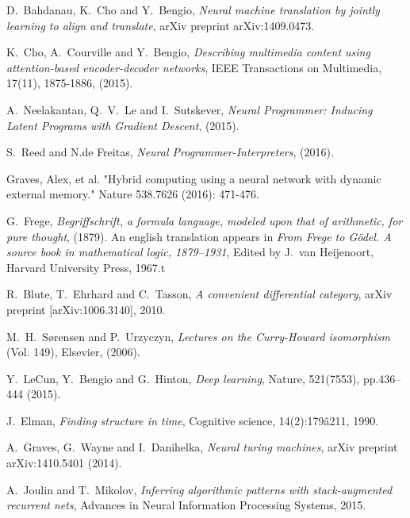 \documentclass[english,letter paper,12pt,leqno]{article}
\theoremstyle{example}
\numberwithin{equation}{section}
\begin{document}

\providecommand{\bysame}{\leavevmode\hbox to3em{\hrulefill}\thinspace}
\providecommand{\href}[2]{#2}
\begin{thebibliography}{BHLS03}

D.~Bahdanau, K.~Cho and Y.~Bengio, \textsl{Neural machine translation by jointly learning to align and translate}, arXiv preprint arXiv:1409.0473.

K.~Cho, A.~Courville and Y.~Bengio, \textsl{Describing multimedia content using attention-based encoder-decoder networks}, IEEE Transactions on Multimedia, 17(11), 1875-1886, (2015).

A.~Neelakantan, Q.~V.~Le and I.~Sutskever, \textsl{Neural Programmer: Inducing Latent Programs with Gradient Descent}, (2015).

S.~Reed and N.de Freitas, \textsl{Neural Programmer-Interpreters}, (2016).

Graves, Alex, et al. "Hybrid computing using a neural network with dynamic external memory." Nature 538.7626 (2016): 471-476.

G.~Frege, \textsl{Begriffschrift, a formula language, modeled upon that of arithmetic, for pure thought}, (1879). An english translation appears in \textsl{From Frege to G\"odel. A source book in mathematical logic, 1879--1931}, Edited by J.~van Heijenoort, Harvard University Press, 1967.t

R.~Blute, T.~Ehrhard and C.~Tasson, \textsl{A convenient differential category}, arXiv preprint \href{https://arxiv.org/abs/1006.3140}{[arXiv:1006.3140]}, 2010.

M.~H.~S\o rensen and P.~Urzyczyn, \textsl{Lectures on the Curry-Howard isomorphism} (Vol. 149), Elsevier, (2006).

Y.~LeCun, Y.~Bengio and G.~Hinton, \textsl{Deep learning},  Nature, 521(7553), pp.436--444 (2015).

J.~Elman, \textsl{Finding structure in time}, Cognitive science, 14(2):179â211, 1990.

A.~Graves, G.~Wayne and I.~Danihelka, \textsl{Neural turing machines}, arXiv preprint arXiv:1410.5401 (2014).

A.~Joulin and T.~Mikolov, \textsl{Inferring algorithmic patterns with stack-augmented recurrent nets}, Advances in Neural Information Processing Systems, 2015.


\end{thebibliography}
\end{document}
